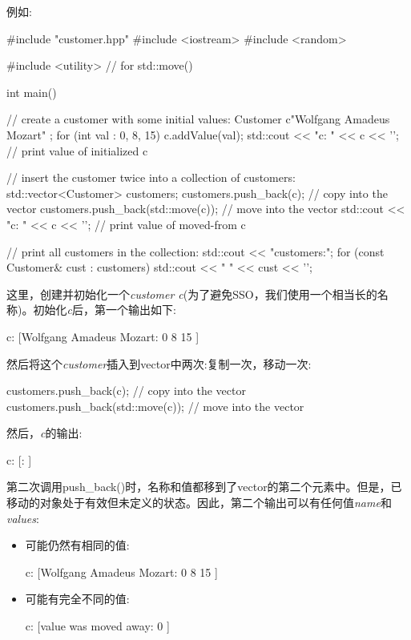 例如:

\begin{cppcode}
#include "customer.hpp"
#include <iostream>
#include <random>

#include <utility> // for std::move()

int main()
{
	// create a customer with some initial values:
	Customer c{"Wolfgang Amadeus Mozart" };
	for (int val : {0, 8, 15}) {
		c.addValue(val);
	}
	std::cout << "c: " << c << '\n'; // print value of initialized c
	
	// insert the customer twice into a collection of customers:
	std::vector<Customer> customers;
	customers.push_back(c); // copy into the vector
	customers.push_back(std::move(c)); // move into the vector
	std::cout << "c: " << c << '\n'; // print value of moved-from c
	
	// print all customers in the collection:
	std::cout << "customers:\n";
	for (const Customer& cust : customers) {
		std::cout << " " << cust << '\n';
	}
}
\end{cppcode}

这里，创建并初始化一个\textit{customer c}(为了避免SSO，我们使用一个相当长的名称)。初始化\textit{c}后，第一个输出如下:

\begin{shell}
c: [Wolfgang Amadeus Mozart: 0 8 15 ]
\end{shell}

然后将这个\textit{customer}插入到vector中两次:复制一次，移动一次:

\begin{cppcode}
customers.push_back(c); // copy into the vector
customers.push_back(std::move(c)); // move into the vector
\end{cppcode}

然后，\textit{c}的输出:

\begin{shell}
c: [: ]
\end{shell}

第二次调用push_back()时，名称和值都移到了vector的第二个元素中。但是，已移动的对象处于有效但未定义的状态。因此，第二个输出可以有任何值\textit{name}和\textit{values}:

\begin{itemize}
	\item 可能仍然有相同的值:

	\begin{shell}
	c: [Wolfgang Amadeus Mozart: 0 8 15 ]
	\end{shell}
	\item 可能有完全不同的值:

	\begin{shell}
	c: [value was moved away: 0 ]
	\end{shell}
\end{itemize}

